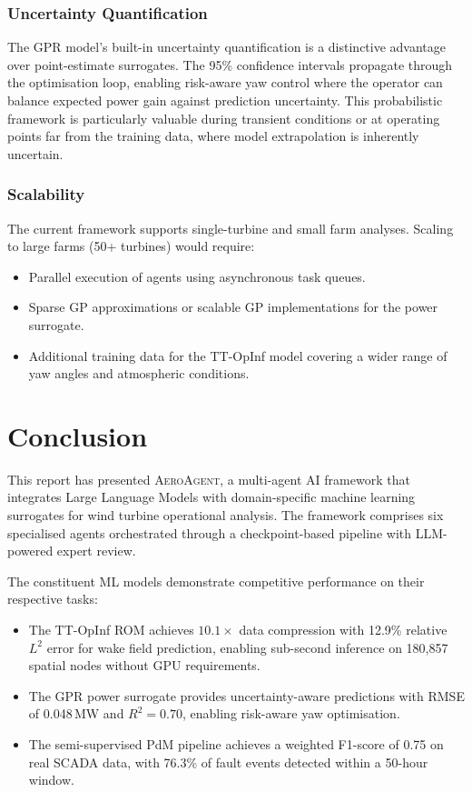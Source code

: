 \documentclass[12pt]{article}
\begin{document}
\subsubsection{Uncertainty Quantification}

The GPR model's built-in uncertainty quantification is a distinctive advantage over point-estimate surrogates.
The 95\% confidence intervals propagate through the optimisation loop, enabling risk-aware yaw control where the operator can balance expected power gain against prediction uncertainty.
This probabilistic framework is particularly valuable during transient conditions or at operating points far from the training data, where model extrapolation is inherently uncertain.

\subsubsection{Scalability}

The current framework supports single-turbine and small farm analyses.
Scaling to large farms (50+ turbines) would require:
\begin{itemize}[leftmargin=*]
    \item Parallel execution of agents using asynchronous task queues.
    \item Sparse GP approximations \citep{Titsias2009} or scalable GP implementations for the power surrogate.
    \item Additional training data for the TT-OpInf model covering a wider range of yaw angles and atmospheric conditions.
\end{itemize}


\section{Conclusion}
\label{sec:conclusion}

This report has presented \textsc{AeroAgent}, a multi-agent AI framework that integrates Large Language Models with domain-specific machine learning surrogates for wind turbine operational analysis.
The framework comprises six specialised agents orchestrated through a checkpoint-based pipeline with LLM-powered expert review.

The constituent ML models demonstrate competitive performance on their respective tasks:
\begin{itemize}[leftmargin=*]
    \item The TT-OpInf ROM achieves $10.1\times$ data compression with 12.9\% relative $L^2$ error for wake field prediction, enabling sub-second inference on 180{,}857 spatial nodes without GPU requirements.
    \item The GPR power surrogate provides uncertainty-aware predictions with RMSE of 0.048\,MW and $R^2 = 0.70$, enabling risk-aware yaw optimisation.
    \item The semi-supervised PdM pipeline achieves a weighted F1-score of 0.75 on real SCADA data, with 76.3\% of fault events detected within a 50-hour window.
\end{itemize}
\end{document}

